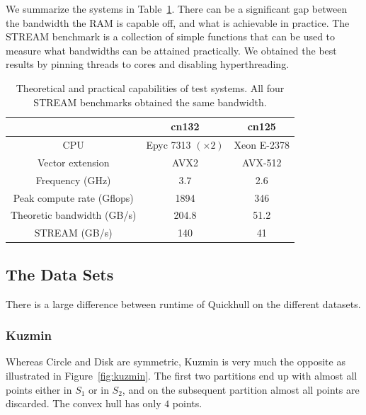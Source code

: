 We summarize the systems in Table~\ref{tab:system}. There can be a significant
gap between the bandwidth the RAM is capable off, and what is achievable in
practice. The STREAM benchmark \cite{McCalpin95} is a collection of simple
functions that can be used to measure what bandwidths can be attained 
practically. We obtained the best results by pinning threads to cores and 
disabling hyperthreading.

\begin{table}[ht]
    \caption{Theoretical and practical capabilities of test systems. All four
             STREAM benchmarks obtained the same bandwidth.}
    \label{tab:system}
    \begin{tabular}{c|c|c}
                                   & cn132 & cn125          \\
        \hline                                              
        CPU                        & Epyc 7313 $(\times 2)$ 
                                           & Xeon E-2378    \\
        Vector extension           & AVX2  & AVX-512        \\
        Frequency (GHz)            & 3.7   & 2.6            \\
        Peak compute rate (Gflops) & 1894  & 346            \\
        Theoretic bandwidth (GB/s) & 204.8 & 51.2           \\ 
        STREAM (GB/s)              & 140   & 41             \\ 
    \end{tabular}
\end{table}

\subsection{The Data Sets}\label{subsec:datasets}

There is a large difference between runtime of Quickhull on the different 
datasets.

\subsubsection{Kuzmin}

Whereas Circle and Disk are symmetric, Kuzmin is very much the opposite
as illustrated in Figure~\ref{fig:kuzmin}.
The first two partitions end up with almost all points either in $S_1$ or
in $S_2$, and on the subsequent partition almost all points are discarded.
The convex hull has only $4$ points.

